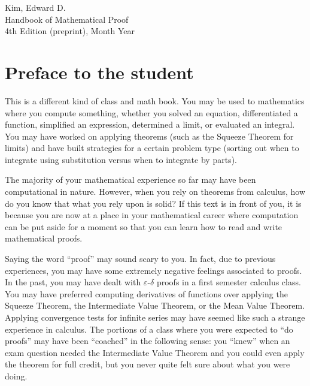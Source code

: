 \documentclass{book}
\theoremstyle{ekimcustom}
\begin{document}
\vskip24pt\noindent
Kim, Edward D.\\
Handbook of Mathematical Proof\\
4th Edition (preprint), Month Year

%


\tableofcontents

\chapter*{Preface to the student}

This is a different kind of class and math book. You may be used to mathematics where you compute something, whether you solved an equation, differentiated a function, simplified an expression, determined a limit, or evaluated an integral. You may have worked on applying theorems (such as the Squeeze Theorem for limits) and have built strategies for a certain problem type (sorting out when to integrate using substitution versus when to integrate by parts).

The majority of your mathematical experience so far may have been computational in nature. However, when you rely on theorems from calculus, how do you know that what you rely upon is solid? If this text is in front of you, it is because you are now at a place in your mathematical career where computation can be put aside for a moment so that you can learn how to read and write mathematical proofs.

Saying the word ``proof'' may sound scary to you. In fact, due to previous experiences, you may have some extremely negative feelings associated to proofs. In the past, you may have dealt with $\varepsilon$-$\delta$ proofs in a first semester calculus class. You may have preferred computing derivatives of functions over applying the Squeeze Theorem, the Intermediate Value Theorem, or the Mean Value Theorem. Applying convergence tests for infinite series may have seemed like such a strange experience in calculus. The portions of a class where you were expected to ``do proofs'' may have been ``coached'' in the following sense: you ``knew'' when an exam question needed the Intermediate Value Theorem and you could even apply the theorem for full credit, but you never quite felt sure about what you were doing.
\end{document}
